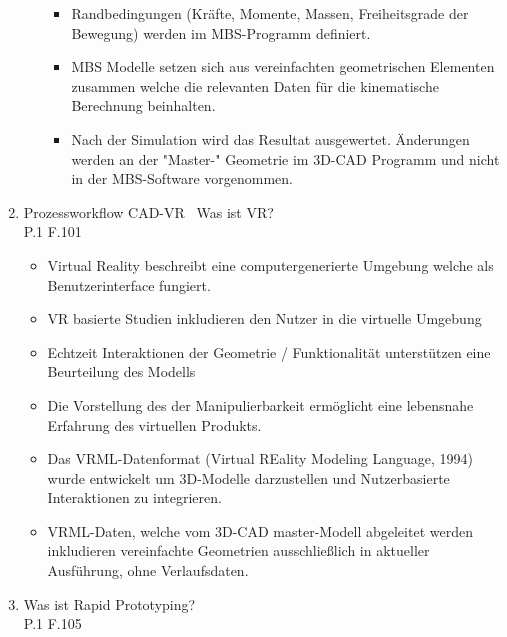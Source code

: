 \documentclass[10pt,a4paper,fleqn]{article}
\begin{document}
\begin{enumerate}
\begin{itemize}
\begin{itemize}
						\item Randbedingungen (Kräfte, Momente, Massen, Freiheitsgrade der Bewegung) werden im MBS-Programm definiert.
						\item MBS Modelle setzen sich aus vereinfachten geometrischen Elementen zusammen welche die relevanten Daten für die kinematische Berechnung beinhalten.
						\item Nach der Simulation wird das Resultat ausgewertet. Änderungen werden an der "Master-" Geometrie im 3D-CAD Programm und nicht in der MBS-Software vorgenommen.
					\end{itemize}
			\end{itemize}
	\item Prozessworkflow CAD-VR \ Was ist VR?\\
		P.1 F.101
		\begin{itemize}
			\item Virtual Reality beschreibt eine computergenerierte Umgebung welche als Benutzerinterface fungiert.
			\item VR basierte Studien inkludieren den Nutzer in die virtuelle Umgebung
			\item Echtzeit Interaktionen der Geometrie / Funktionalität unterstützen eine Beurteilung des Modells
			\item Die Vorstellung des der Manipulierbarkeit ermöglicht eine lebensnahe Erfahrung des virtuellen Produkts.
			\item Das VRML-Datenformat (Virtual REality Modeling Language, 1994) wurde entwickelt um 3D-Modelle darzustellen und Nutzerbasierte Interaktionen zu integrieren.
			\item VRML-Daten, welche vom 3D-CAD master-Modell abgeleitet werden inkludieren vereinfachte Geometrien ausschließlich in aktueller Ausführung, ohne Verlaufsdaten.
		\end{itemize}
	\item Was ist Rapid Prototyping?\\
		P.1 F.105

\end{enumerate}
\end{document}

